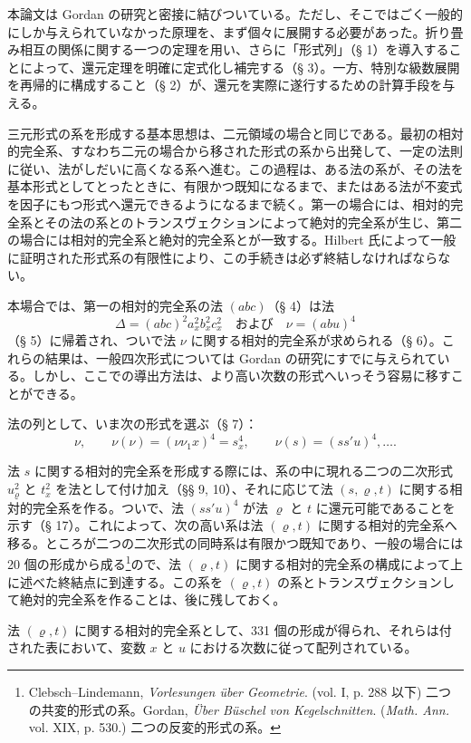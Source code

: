 \documentclass[11pt]{jlreq}
\begin{document}
本論文は Gordan の研究と密接に結びついている。ただし、そこではごく一般的にしか与えられていなかった原理を、まず個々に展開する必要があった。折り畳み相互の関係に関する一つの定理を用い、さらに「形式列」（§ 1）を導入することによって、還元定理を明確に定式化し補完する（§ 3）。一方、特別な級数展開を再帰的に構成すること（§ 2）が、還元を実際に遂行するための計算手段を与える。

三元形式の系を形成する基本思想は、二元領域の場合と同じである。最初の相対的完全系、すなわち二元の場合から移された形式の系から出発して、一定の法則に従い、法がしだいに高くなる系へ進む。この過程は、ある法の系が、その法を基本形式としてとったときに、有限かつ既知になるまで、またはある法が不変式を因子にもつ形式へ還元できるようになるまで続く。第一の場合には、相対的完全系とその法の系とのトランスヴェクションによって絶対的完全系が生じ、第二の場合には相対的完全系と絶対的完全系とが一致する。Hilbert 氏によって一般に証明された形式系の有限性により、この手続きは必ず終結しなければならない。

本場合では、第一の相対的完全系の法 $(abc)$（§ 4）は法
\[
\Delta=(abc)^2a_x^2b_x^2c_x^2\quad\text{および}\quad \nu=(abu)^4
\]
（§ 5）に帰着され、ついで法 $\nu$ に関する相対的完全系が求められる（§ 6）。これらの結果は、一般四次形式については Gordan の研究にすでに与えられている。しかし、ここでの導出方法は、より高い次数の形式へいっそう容易に移すことができる。

法の列として、いま次の形式を選ぶ（§ 7）：
\[
\nu,\qquad \nu(\nu)=(\nu\nu_1x)^4=s_x^4,\qquad \nu(s)=(ss'u)^4,\ldots .
\]

法 $s$ に関する相対的完全系を形成する際には、系の中に現れる二つの二次形式 $u_\varrho^2$ と $t_x^2$ を法として付け加え（§§ 9, 10）、それに応じて法 $(s,\varrho,t)$ に関する相対的完全系を作る。ついで、法 $(ss'u)^4$ が法 $\varrho$ と $t$ に還元可能であることを示す（§ 17）。これによって、次の高い系は法 $(\varrho,t)$ に関する相対的完全系へ移る。ところが二つの二次形式の同時系は有限かつ既知であり、一般の場合には 20 個の形成から成る\footnote{Clebsch--Lindemann, \emph{Vorlesungen über Geometrie}. (vol. I, p. 288 以下) 二つの共変的形式の系。Gordan, \emph{Über Büschel von Kegelschnitten}. (\emph{Math. Ann.} vol. XIX, p. 530.) 二つの反変的形式の系。}ので、法 $(\varrho,t)$ に関する相対的完全系の構成によって上に述べた終結点に到達する。この系を $(\varrho,t)$ の系とトランスヴェクションして絶対的完全系を作ることは、後に残しておく。

法 $(\varrho,t)$ に関する相対的完全系として、331 個の形成が得られ、それらは付された表において、変数 $x$ と $u$ における次数に従って配列されている。
\end{document}

